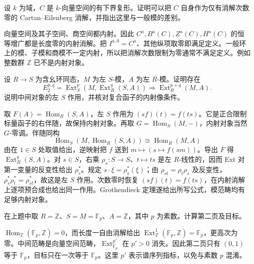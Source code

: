 \begin{exercise}\label{b4:ex:15-field-ce}
	设 \(k\) 为域，\(C\) 是 \(k\)-向量空间的有下界复形。证明可以把 \(C\) 自身作为仅有消解次数零的 Cartan--Eilenberg 消解，并指出这里与一般模的差别。
\end{exercise}
\begin{solution}
	向量空间及其子空间、商空间都内射。因此 \(C^a,B^a(C),Z^a(C),H^a(C)\) 的恒等增广都是长度零的内射消解。把 \(I^{a,0}=C^a\)、其他纵项取零即满足定义。一般环上的模、子模和商模不一定内射，所以把消解次数限制为零通常不满足定义。例如整数群 \(\mathbb Z\) 已不是内射对象。
\end{solution}

\begin{exercise}\label{b4:ex:15-change-rings-ext}
	设 \(R\to S\) 为含幺环同态，\(M\) 为左 \(S\)-模，\(A\) 为左 \(R\)-模。证明存在
	\[
		E_2^{p,q}=\operatorname{Ext}_S^p(M,\operatorname{Ext}_R^q(S,A)) \Longrightarrow\operatorname{Ext}_R^{p+q}(M,A).
	\]
	说明中间对象的左 \(S\) 作用，并核对复合函子的内射像条件。
\end{exercise}
\begin{solution}
	取 \(F(A)=\operatorname{Hom}_R(S,A)\)，左 \(S\) 作用为 \((s f)(t)=f(ts)\)。它是正合限制标量函子的右伴随，故保持内射对象。再取 \(G=\operatorname{Hom}_S(M,-)\)，内射对象当然 \(G\)-零调。伴随同构
	\[
		\operatorname{Hom}_S(M,\operatorname{Hom}_R(S,A)) \cong\operatorname{Hom}_R(M,A)
	\]
	由在 \(1\in S\) 处取值给出，逆映射把 \(f\) 送到 \(m\mapsto(s\mapsto f(sm))\)。导出 \(F\) 得 \(\operatorname{Ext}_R^q(S,A)\)。对 \(s\in S\)，右乘 \(\rho_s:S\to S\)、\(t\mapsto ts\) 是左 \(R\)-线性的，因而 Ext 对第一变量的反变性给出 \(\rho_s^*\)。规定 \(s\cdot\xi=\rho_s^*(\xi)\)；由 \(\rho_{st}=\rho_t\rho_s\) 及反变性，\(\rho_s^*\rho_t^*=\rho_{st}^*\)，故这是左 \(S\) 作用。次数零时恢复 \((s f)(t)=f(ts)\)，在内射消解上逐项预合成也给出同一作用。Grothendieck 定理遂给出所写公式，模范畴均有足够内射对象。
\end{solution}

\begin{exercise}\label{b4:ex:15-change-rings-prime}
	在上题中取 \(R=\mathbb Z\)、\(S=M=\mathbb F_p\)、\(A=\mathbb Z\)，其中 \(p\) 为素数。计算第二页及目标。
\end{exercise}
\begin{solution}
	\(\operatorname{Hom}_{\mathbb Z}(\mathbb F_p,\mathbb Z)=0\)，而长度一自由消解给出 \(\operatorname{Ext}_{\mathbb Z}^1(\mathbb F_p,\mathbb Z)=\mathbb F_p\)，更高次为零。中间范畴是向量空间范畴，\(\operatorname{Ext}_{\mathbb F_p}^{p'}\) 在 \(p'>0\) 消失。因此第二页只有 \((0,1)\) 等于 \(\mathbb F_p\)，目标只在一次等于 \(\mathbb F_p\)。这里 \(p'\) 表示谱序列指标，以免与素数 \(p\) 混淆。
\end{solution}

